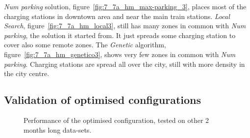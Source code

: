 \textit{Num parking} solution, figure~\ref{fig:7_7a_hm_max-parking_3}, places most of the charging stations in downtown area and near the main train stations. 
\textit{Local Search}, figure~\ref{fig:7_7a_hm_local3}, still has many zones in common with \textit{Num parking}, the solution it started from. It just spreads some charging station to cover also some remote zones.
The \textit{Genetic} algorithm, figure~\ref{fig:7_7a_hm_genetico3}, shows very few zones in common with \textit{Num parking}. Charging stations are spread all over the city, still with more density in the city centre. 
 

\subsection{Validation of optimised configurations}

\begin{figure}[t]
    \centering     %

    \caption{Performance of the optimised configuration, tested on other 2 months long data-sets.}
    \label{fig:validation}
\end{figure}


